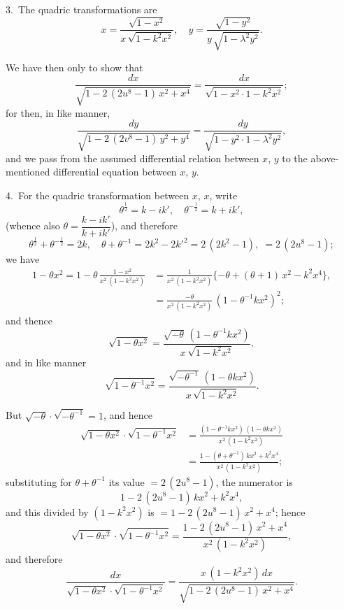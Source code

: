 \documentclass[11pt,a4paper]{book}
\begin{document}
3.\ The quadric transformations are
\[
x = \frac{\sqrt{1 - x^2}}{x\, \sqrt{1 - k^2 x^2}}, \quad
y = \frac{\sqrt{1 - y^2}}{y\, \sqrt{1 - \lambda^2 y^2}}.
\]

We have then only to show that
\[
\frac{dx}{\sqrt{1 - 2\, (2u^8 - 1)\, x^2 + x^4}}
= \frac{dx}{\sqrt{1 - x^2 \cdot 1 - k^2 x^2}};
\]
for then, in like manner,
\[
\frac{dy}{\sqrt{1 - 2\, (2v^8 - 1)\, y^2 + y^4}}
= \frac{dy}{\sqrt{1 - y^2 \cdot 1 - \lambda^2 y^2}},
\]
and we pass from the assumed differential relation between $x$, $y$ to the above-mentioned
differential equation between $x$, $y$.

4.\ For the quadric transformation between $x$, $x$, write
\[
\theta^{\frac12} = k - ik', \quad \theta^{-\frac12} = k + ik',
\]
(whence also $\theta = \dfrac{k - ik'}{k + ik'}$), and therefore
\[
\theta^{\frac12} + \theta^{-\frac12} = 2k, \quad
\theta + \theta^{-1} = 2k^2 - 2k'^2 = 2\, (2k^2 - 1), \; = 2\, (2u^8 - 1);
\]
we have
\begin{align*}
1 - \theta x^2 = 1 - \theta \, \frac{1 - x^2}{x^2\, (1 - k^2 x^2)}
&= \frac{1}{x^2\, (1 - k^2 x^2)}
\{-\theta + (\theta + 1)\, x^2 - k^2 x^4\},\\
&= \frac{-\theta}{x^2\, (1 - k^2 x^2)}\, (1 - \theta^{-1} k x^2)^2;
\end{align*}
and thence
\[
\sqrt{1 - \theta x^2} = \frac{\sqrt{-\theta}\, (1 - \theta^{-1} k x^2)}{x\, \sqrt{1 - k^2 x^2}},
\]
and in like manner
\[
\sqrt{1 - \theta^{-1} x^2} = \frac{\sqrt{-\theta^{-1}}\, (1 - \theta k x^2)}{x\, \sqrt{1 - k^2 x^2}}.
\]

But $\sqrt{-\theta} \cdot \sqrt{-\theta^{-1}} = 1$, and hence
\begin{align*}
\sqrt{1 - \theta x^2} \cdot \sqrt{1 - \theta^{-1} x^2}
&= \frac{(1 - \theta^{-1} k x^2)\, (1 - \theta k x^2)}{x^2\, (1 - k^2 x^2)}\\
&= \frac{1 - (\theta + \theta^{-1})\, k x^2 + k^2 x^4}{x^2\, (1 - k^2 x^2)};
\end{align*}
substituting for $\theta + \theta^{-1}$ its value $= 2\, (2u^8 - 1)$, the numerator is
\[
1 - 2\, (2u^8 - 1)\, k x^2 + k^2 x^4,
\]
and this divided by $(1 - k^2 x^2)$ is $= 1 - 2\, (2u^8 - 1)\, x^2 + x^4$;
hence
\[
\sqrt{1 - \theta x^2} \cdot \sqrt{1 - \theta^{-1} x^2}
= \frac{1 - 2\, (2u^8 - 1)\, x^2 + x^4}{x^2\, (1 - k^2 x^2)},
\]
and therefore
\[
\frac{dx}{\sqrt{1 - \theta x^2} \cdot \sqrt{1 - \theta^{-1} x^2}}
= \frac{x\, (1 - k^2 x^2)\, dx}{\sqrt{1 - 2\, (2u^8 - 1)\, x^2 + x^4}}.
\]
\end{document}

